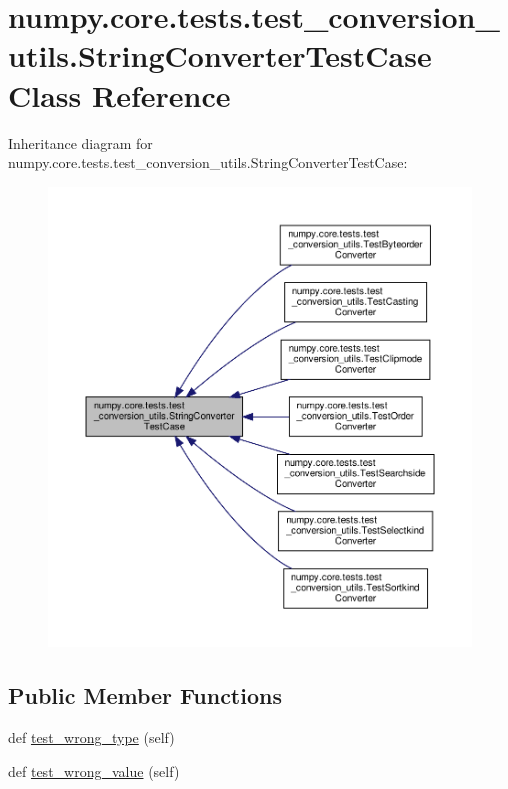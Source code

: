 \hypertarget{classnumpy_1_1core_1_1tests_1_1test__conversion__utils_1_1StringConverterTestCase}{}\section{numpy.\+core.\+tests.\+test\+\_\+conversion\+\_\+utils.\+String\+Converter\+Test\+Case Class Reference}
\label{classnumpy_1_1core_1_1tests_1_1test__conversion__utils_1_1StringConverterTestCase}


Inheritance diagram for numpy.\+core.\+tests.\+test\+\_\+conversion\+\_\+utils.\+String\+Converter\+Test\+Case\+:
\nopagebreak
\begin{figure}[H]
\begin{center}
\leavevmode
\includegraphics[width=350pt]{classnumpy_1_1core_1_1tests_1_1test__conversion__utils_1_1StringConverterTestCase__inherit__graph}
\end{center}
\end{figure}
\subsection*{Public Member Functions}
\begin{DoxyCompactItemize}
\item 
def \hyperlink{classnumpy_1_1core_1_1tests_1_1test__conversion__utils_1_1StringConverterTestCase_aea50efe081489f123c7fe52c2770c914}{test\+\_\+wrong\+\_\+type} (self)
\item 
def \hyperlink{classnumpy_1_1core_1_1tests_1_1test__conversion__utils_1_1StringConverterTestCase_a18096b3941130b7df9387324cf4223fa}{test\+\_\+wrong\+\_\+value} (self)
\end{DoxyCompactItemize}
